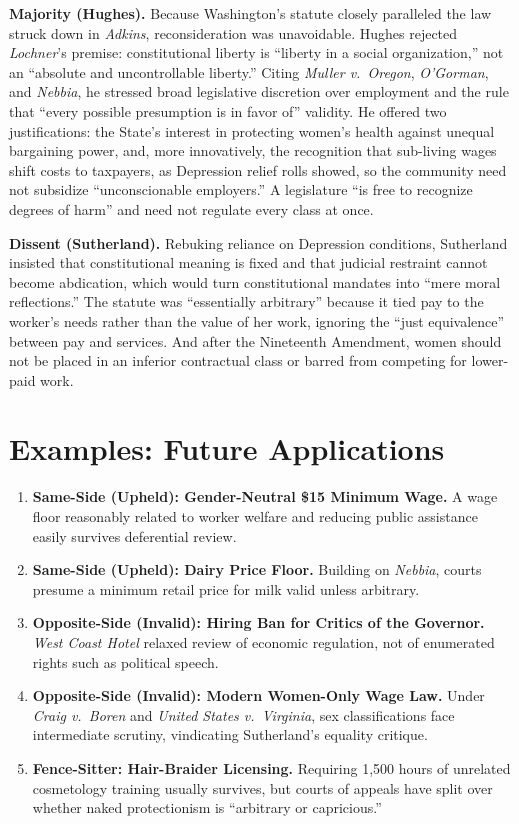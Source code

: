 \documentclass[12pt]{article}
\begin{document}
\textbf{Majority (Hughes).} Because Washington's statute closely paralleled the law struck down in \textit{Adkins}, reconsideration was unavoidable. Hughes rejected \textit{Lochner}'s premise: constitutional liberty is ``liberty in a social organization,'' not an ``absolute and uncontrollable liberty.'' Citing \textit{Muller v.\ Oregon}, \textit{O'Gorman}, and \textit{Nebbia}, he stressed broad legislative discretion over employment and the rule that ``every possible presumption is in favor of'' validity. He offered two justifications: the State's interest in protecting women's health against unequal bargaining power, and, more innovatively, the recognition that sub-living wages shift costs to taxpayers, as Depression relief rolls showed, so the community need not subsidize ``unconscionable employers.'' A legislature ``is free to recognize degrees of harm'' and need not regulate every class at once.

\textbf{Dissent (Sutherland).} Rebuking reliance on Depression conditions, Sutherland insisted that constitutional meaning is fixed and that judicial restraint cannot become abdication, which would turn constitutional mandates into ``mere moral reflections.'' The statute was ``essentially arbitrary'' because it tied pay to the worker's needs rather than the value of her work, ignoring the ``just equivalence'' between pay and services. And after the Nineteenth Amendment, women should not be placed in an inferior contractual class or barred from competing for lower-paid work.

\section{Examples: Future Applications}

\begin{enumerate}
\item \textbf{Same-Side (Upheld): Gender-Neutral \$15 Minimum Wage.} A wage floor reasonably related to worker welfare and reducing public assistance easily survives deferential review.
\item \textbf{Same-Side (Upheld): Dairy Price Floor.} Building on \textit{Nebbia}, courts presume a minimum retail price for milk valid unless arbitrary.
\item \textbf{Opposite-Side (Invalid): Hiring Ban for Critics of the Governor.} \textit{West Coast Hotel} relaxed review of economic regulation, not of enumerated rights such as political speech.
\item \textbf{Opposite-Side (Invalid): Modern Women-Only Wage Law.} Under \textit{Craig v.\ Boren} and \textit{United States v.\ Virginia}, sex classifications face intermediate scrutiny, vindicating Sutherland's equality critique.
\item \textbf{Fence-Sitter: Hair-Braider Licensing.} Requiring 1,500 hours of unrelated cosmetology training usually survives, but courts of appeals have split over whether naked protectionism is ``arbitrary or capricious.''
\end{enumerate}
\end{document}
